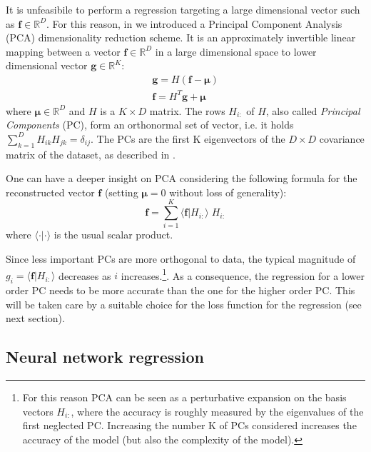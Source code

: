 \documentclass[twocolumn,showpacs,preprintnumbers,nofootinbib,prd,
superscriptaddress,10pt]{revtex4-1}
\newcommand{\R}{\mathbb{R}}
\begin{document}
It is unfeasibile to perform a regression targeting a large dimensional vector such as $\boldsymbol{f} \in \R^D$. For this reason, in \cite{Schmidt:2020yuu} we introduced a Principal Component Analysis (PCA) dimensionality reduction scheme.
It is an approximately invertible linear mapping between a vector $\boldsymbol{f} \in \R^D$ in a large dimensional space to lower dimensional vector  $\boldsymbol{g} \in \R^K$:
%
\begin{align}
	\mathbf{g} = H (\mathbf{f} - \boldsymbol{\mu}) \label{eq:PCA_reduction_model}\\
	\mathbf{f} = H^T \mathbf{g} + \boldsymbol{\mu} \label{eq:PCA_reconstruction_model}
\end{align}
where $\boldsymbol{\mu} \in \R^D$ and $H$ is a $K \times D$ matrix. The rows $H_{i:}$ of $H$, also called {\it Principal Components} (PC), form an orthonormal set of vector, i.e. it holds ${\sum_{k=1}^D H_{ik} H_{jk} = \delta_{ij}}$.
The PCs are the first K eigenvectors of the $D \times D$ covariance matrix of the dataset, as described in \cite[Sec. 12]{murphy2012machine}.

One can have a deeper insight on PCA considering the following formula for the reconstructed vector $\mathbf{f}$ (setting $\boldsymbol{\mu}=0$ without loss of generality):
\begin{equation} \label{eq:perturbative_exp}
	\mathbf{f} = \sum_{i=1}^K \langle \mathbf{f} | H_{i:} \rangle \; H_{i:}
\end{equation}
%
where $\langle \cdot | \cdot \rangle$ is the usual scalar product.

Since less important PCs are more orthogonal to data, the typical magnitude of $g_i = \langle \mathbf{f} | H_{i:} \rangle$ decreases as $i$ increases.\footnote{For this reason PCA can be seen as a perturbative expansion on the basis vectors $H_{i:}$, where the accuracy is roughly measured by the eigenvalues of the first neglected PC. Increasing the number K of PCs considered increases the accuracy of the model (but also the complexity of the model).}.
As a consequence, the regression for a lower order PC needs to be more accurate than the one for the higher order PC. This will be taken care by a suitable choice for the loss function for the regression (see next section).


\subsection{Neural network regression}
\label{sec:NN}
\end{document}
